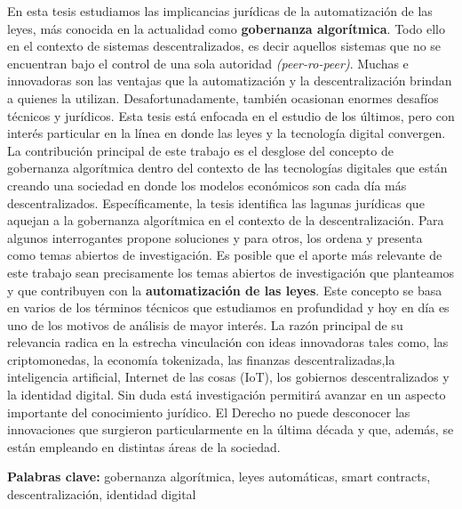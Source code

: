 \documentclass[12pt]{report} %
\begin{document}
En esta tesis estudiamos las implicancias jurídicas de la automatización de las leyes, más conocida en
la actualidad como \textbf{gobernanza algorítmica}. Todo ello en el contexto de sistemas descentralizados, es decir
aquellos sistemas que no se encuentran bajo el control de una sola autoridad \textit{(peer-ro-peer)}. Muchas e
innovadoras son las ventajas que la automatización y la descentralización brindan a quienes la utilizan.
Desafortunadamente, también ocasionan enormes desafíos técnicos y jurídicos. Esta tesis está enfocada en el
estudio de los últimos, pero con interés particular en la línea en donde las leyes y la tecnología digital
convergen. La contribución principal de este trabajo es el desglose del concepto de gobernanza algorítmica
dentro del contexto de las tecnologías digitales que están creando una sociedad en donde los modelos
económicos son cada día más descentralizados. Específicamente, la tesis identifica las lagunas jurídicas
que aquejan a la gobernanza algorítmica en el contexto de la descentralización. Para algunos interrogantes
propone soluciones y para otros, los ordena y presenta como temas abiertos de investigación. Es posible que
el aporte más relevante de este trabajo sean precisamente los temas abiertos de investigación que planteamos
y que contribuyen con la \textbf{automatización de las leyes}. Este concepto se basa en varios de los términos
técnicos que estudiamos en profundidad y hoy en día es uno de los motivos de análisis de mayor interés. La
razón principal de su relevancia radica en la estrecha vinculación con ideas innovadoras tales como, las
criptomonedas, la economía tokenizada, las finanzas descentralizadas,la inteligencia artificial, Internet de las cosas (IoT), los gobiernos descentralizados y la identidad digital. Sin duda está investigación permitirá avanzar en
un aspecto importante del conocimiento jurídico. El Derecho no puede desconocer las innovaciones que
surgieron particularmente en la última década y que, además, se están empleando en distintas áreas de la
sociedad.

\textbf{Palabras clave:} gobernanza algorítmica, leyes automáticas, smart contracts, descentralización, identidad digital
\end{document}
